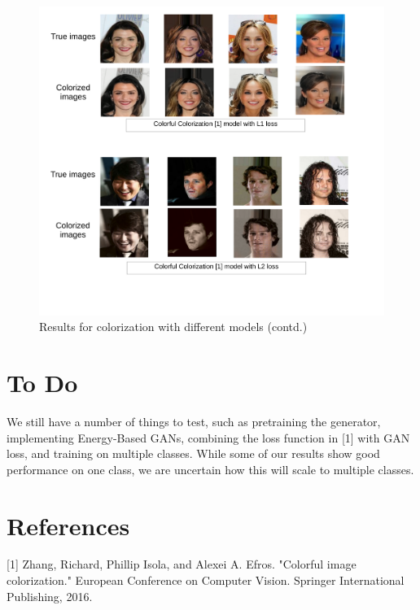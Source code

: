 \documentclass[11pt]{article}
\begin{document}
\begin{figure}[t]
\vspace{-10mm}
\hspace{-20mm}
\includegraphics [scale=0.35]{3.pdf}
\vspace{-18mm}
\caption{Results for colorization with different models (contd.)}
\label{fig:2}
\end{figure}

\newpage
\section{To Do}
We still have a number of things to test, such as pretraining the generator, implementing Energy-Based GANs,
combining the loss function in [1] with GAN loss, and training on multiple classes. While some of our results
show good performance on one class, we are uncertain how this will scale to multiple classes.



\section{References}
[1] Zhang, Richard, Phillip Isola, and Alexei A. Efros. "Colorful image colorization." 
European Conference on Computer Vision. Springer International Publishing, 2016.
\vspace{2pt}
\end{document}
